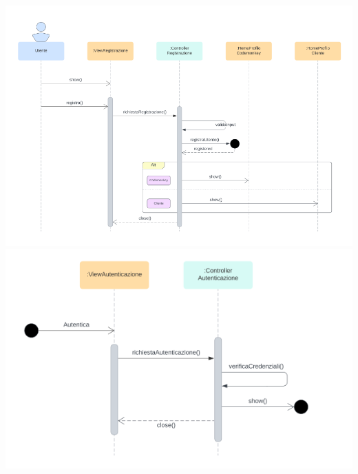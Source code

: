 \includegraphics[width=1\textwidth]{assets/img/sequenza/accesso-1.png}\\
\includegraphics[width=1\textwidth]{assets/img/sequenza/accesso-2.png}\\
